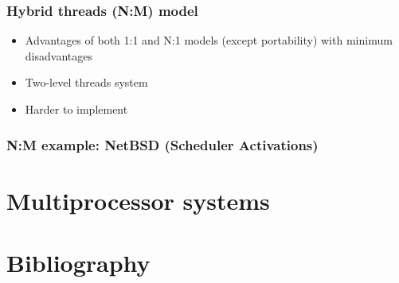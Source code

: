 
\begin{frame}
  \frametitle{Hybrid threads (N:M) model}

  \begin{itemize}
  \item
    Advantages of both 1:1 and N:1 models (except portability) with
    minimum disadvantages
  \item
    Two-level threads system
  \item
    Harder to implement
  \end{itemize}

\end{frame}


\begin{frame}
  \frametitle{N:M example: NetBSD (Scheduler Activations)}

\end{frame}

%
%

\section{Multiprocessor systems}

%
%

\section{Bibliography}

\begin{thebibliography}{4}


\end{thebibliography}


